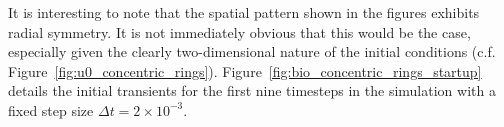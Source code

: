 It is interesting to note that the spatial pattern shown in the figures exhibits radial symmetry.  It is not immediately obvious that this would be the case, especially given the clearly two-dimensional nature of the initial conditions (c.f. Figure~\ref{fig:u0_concentric_rings}).  Figure~\ref{fig:bio_concentric_rings_startup} details the initial transients for the first nine timesteps in the simulation with a fixed step size $\Delta t=2\times 10^{-3}$.
\begin{figure}
  \begin{center}
     \\

\end{center}
\end{figure}
